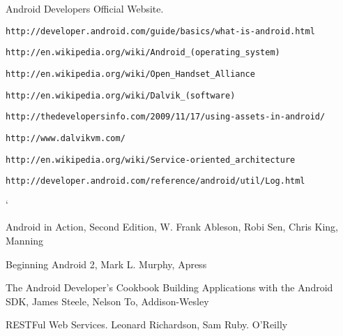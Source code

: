 \documentclass[journal]{IEEEtran}
\begin{document}
 

 

\renewcommand{\refname}{References}

\begin{thebibliography}{50}
 Android Developers Official Website.\\
\begin{scriptsize}  \verb|http://developer.android.com/guide/basics/what-is-android.html|\end{scriptsize}
\begin{scriptsize}  \verb|http://en.wikipedia.org/wiki/Android_(operating_system)|\end{scriptsize}
\begin{scriptsize}  \verb|http://en.wikipedia.org/wiki/Open_Handset_Alliance|\end{scriptsize}
\begin{scriptsize}  \verb|http://en.wikipedia.org/wiki/Dalvik_(software)|\end{scriptsize}
\begin{scriptsize}  \verb|http://thedevelopersinfo.com/2009/11/17/using-assets-in-android/|\end{scriptsize}
\begin{scriptsize}  \verb|http://www.dalvikvm.com/|\end{scriptsize}
\begin{scriptsize}  \verb|http://en.wikipedia.org/wiki/Service-oriented_architecture| \end{scriptsize}
\begin{scriptsize}  \verb|http://developer.android.com/reference/android/util/Log.html| \end{scriptsize}`
\begin{scriptsize}Android in Action, Second Edition, W. Frank Ableson, Robi Sen, Chris King, Manning \end{scriptsize}
\begin{scriptsize}Beginning Android 2, Mark L. Murphy, Apress \end{scriptsize}
\begin{scriptsize}The Android Developer's Cookbook Building Applications with the Android SDK, James Steele, Nelson To, 
Addison-Wesley \end{scriptsize}
\begin{scriptsize}RESTFul Web Services. Leonard Richardson, Sam Ruby. O'Reilly
\end{scriptsize}

\end{thebibliography}
\end{document}
